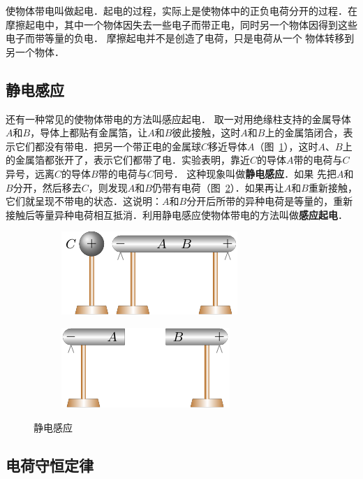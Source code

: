 使物体带电叫做起电．起电的过程，实际上是使物体中的正负电荷分开的过程．在摩擦起电中，其中一个物体因失去一些电子而带正电，同时另一个物体因得到这些电子而带等量的负电．
摩擦起电并不是创造了电荷，只是电荷从一个
物体转移到另一个物体．

\subsection{静电感应} 

还有一种常见的使物体带电的方法叫感应起电．
取一对用绝缘柱支持的金属导体$A$和$B$，导体上都贴有金属箔，让$A$和$B$彼此接触，这时$A$和$B$上的金属箔闭合，表示它们都没有带电．把另一个带正电的金属球$C$移近导体$A$（图~\ref{fig_B_6-2a}），这时$A$、$B$上的金属箔都张开了，表示它们都带了电．实验表明，靠近$C$的导体$A$带的电荷与$C$异号，远离$C$的导体$B$带的电荷与$C$同号．
这种现象叫做\textbf{静电感应}．如果
先把$A$和$B$分开，然后移去$C$，则发现$A$和$B$仍带有电荷（图~\ref{fig_B_6-2b}）．如果再让$A$和$B$重新接触，它们就呈现不带电的状态．这说明：$A$和$B$分开后所带的异种电荷是等量的，重新接触后等量异种电荷相互抵消．利用静电感应使物体带电的方法叫做\textbf{感应起电}．


\begin{figure}[htbp]
	\centering
	\begin{subfigure}{0.4\linewidth}
		\centering
		\includegraphics{fig/B/6-2a.pdf}
		\caption{}\label{fig_B_6-2a}
	\end{subfigure}
	\hfil
	\begin{subfigure}{0.4\linewidth}
		\centering
		\includegraphics{fig/B/6-2b.pdf}
		\caption{}\label{fig_B_6-2b}
	\end{subfigure}
	\caption{静电感应}\label{fig_B_6-2}
\end{figure}




\subsection{电荷守恒定律} 

